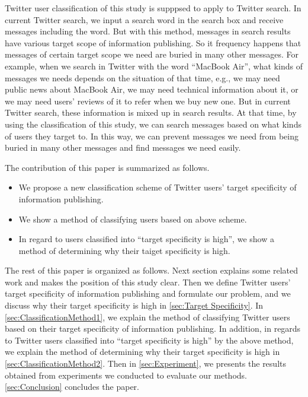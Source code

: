 Twitter user classification of this study is supppsed to apply to
Twitter search.  In current Twitter search, we input a search word in the
search box and receive messages including the word.  But with this
method, messages in search results have various target scope of
information publishing.  So it frequency happens that messages of
certain target scope we need are buried in many other messages. For
example, when we search in Twitter with the word ``MacBook
Air'', what kinds of messages we needs depends on the situation of
that time, e.g., we may need public news about MacBook Air, we
may need technical information about it, or we may need
users' reviews of it to refer when we buy new one.  But in
current Twitter search, these information is mixed up in search results.
At that time, by using the classification of this study, we can
search messages based on what kinds of users they target to.  In this
way, we can prevent messages we need from being buried in many other
messages and find messages we need easily.

The contribution of this paper is summarized as follows.

\begin{itemize}
\item We propose a new classification scheme of Twitter users' target
      specificity of information publishing.
\item We show a method of classifying users based on above scheme.
\item In regard to users classified into ``target specificity is high'',
      we show a method of determining why their taiget specificity is
      high.
\end{itemize}

The rest of this paper is organized as follows.  Next section explains
some related work and makes the position of this study clear.  Then we
define Twitter users' target specificity of information publishing and
formulate our problem, and we discuss why their target specificity is
high in \ref{sec:Target Specificity}.  In
\ref{sec:ClassificationMethod1}, we explain the method of classifying
Twitter users based on their target specificity of information
publishing.  In addition, in regards to Twitter users
classified into  ``target specificity is high'' by the above method,
we explain the method of determining why their target specificity is
high in \ref{sec:ClassificationMethod2}.  Then in \ref{sec:Experiment},
we presents the results obtained from experiments we conducted to
evaluate our methods.  \ref{sec:Conclusion} concludes the paper.

